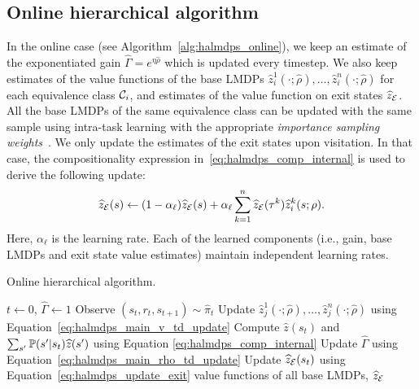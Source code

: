 \subsection{Online hierarchical algorithm}
 In the online case (see Algorithm~\ref{alg:halmdps_online}), we keep an estimate of the exponentiated gain $\widehat\Gamma=e^{\eta\widehat\rho}$ which is updated every timestep. We also keep estimates of the value functions of the base LMDPs $\widehat z_i^1(\cdot;\widehat\rho),\ldots,\widehat z_i^n(\cdot;\widehat\rho)$ for each equivalence class $\mathcal{C}_i$, and estimates of the value function on exit states $\widehat z_{\mathcal{E}}$.  All the base LMDPs of the same equivalence class can be updated with the same sample using intra-task learning with the appropriate {\it importance sampling weights\/}~\citep{Jonsson2016}. We only update the estimates of the exit states upon visitation. In that case, the compositionality expression in~\eqref{eq:halmdps_comp_internal} is used to derive the following update:
\begin{equation}
  \widehat z_{\mathcal{E}}(s)\gets (1-\alpha_\ell) \widehat z_{\mathcal{E}}(s) + \alpha_\ell \sum_{k=1}^n \widehat z_{\mathcal{E}}(\tau^k) \widehat z_i^k(s;\rho).
  \label{eq:halmdps_update_exit}
\end{equation}
Here, $\alpha_\ell$ is the learning rate. Each of the learned components (i.e., gain, base LMDPs and exit state value estimates) maintain independent learning rates.

\begin{algorithm}[!htpb]
  \caption{Online hierarchical algorithm.}
  \begin{algorithmic}[1]
    \State $t \gets 0$, $\widehat{\Gamma} \gets 1$
    \State Observe $(s_{t}, r_{t}, s_{t+1})\sim\widehat\pi_t$
    \State Update $\widehat z_j^1(\cdot;\widehat\rho),\ldots,\widehat z_j^n(\cdot;\widehat\rho)$ using Equation~\eqref{eq:halmdps_main_v_td_update}
    \State Compute $\widehat z(s_t)$ and $\sum_{s'}\mathbb{P}(s'|s_t)\widehat z(s')$ using Equation \eqref{eq:halmdps_comp_internal}
    \State Update $\widehat\Gamma$ using Equation~\eqref{eq:halmdps_main_rho_td_update}
    \State Update $\widehat z_{\mathcal{E}}(s_t)$ using Equation~\eqref{eq:halmdps_update_exit}
    \EndIf
    \EndWhile
    \State \Return value functions of all base LMDPs, ${\widehat z_{\mathcal{E}}}$

  \end{algorithmic}
  \label{alg:halmdps_online}
\end{algorithm}

